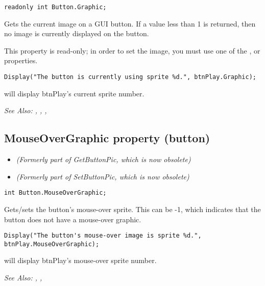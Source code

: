 \begin{verbatim}
readonly int Button.Graphic;
\end{verbatim}
Gets the current image on a GUI button. If a value less than 1 is returned,
then no image is currently displayed on the button.

This property is read-only; in order to set the image, you must use one of the
,
 or
 properties.

\begin{verbatim}
Display("The button is currently using sprite %d.", btnPlay.Graphic);
\end{verbatim}
will display btnPlay's current sprite number.

\it{See Also:} ,
,
,


\subsection{MouseOverGraphic property (button)}\label{Button.MouseOverGraphic}%

\begin{itemize}
\item \it{(Formerly part of GetButtonPic, which is now obsolete)}
\item \it{(Formerly part of SetButtonPic, which is now obsolete)}
\end{itemize}

\begin{verbatim}
int Button.MouseOverGraphic;
\end{verbatim}
Gets/sets the button's mouse-over sprite. This can be -1, which indicates that the button
does not have a mouse-over graphic.

\begin{verbatim}
Display("The button's mouse-over image is sprite %d.", btnPlay.MouseOverGraphic);
\end{verbatim}
will display btnPlay's mouse-over sprite number.

\it{See Also:} ,
,



